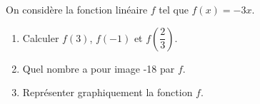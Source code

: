 \documentclass[a4paper,12pt]{article}
\begin{document}
\begin{exo}
On considère la fonction linéaire $f$ tel que $f(x)=-3x$.
\begin{enumerate}
\item Calculer $f(3)$, $f(-1)$ et $f(\dfrac{2}{3})$.\\
\anserline[4]
\item Quel nombre a pour image -18 par $f$.\\
\anserline[2]
\item Représenter graphiquement la fonction $f$.\\
\anserline[14]
\end{enumerate}
\end{exo}
\end{document}
